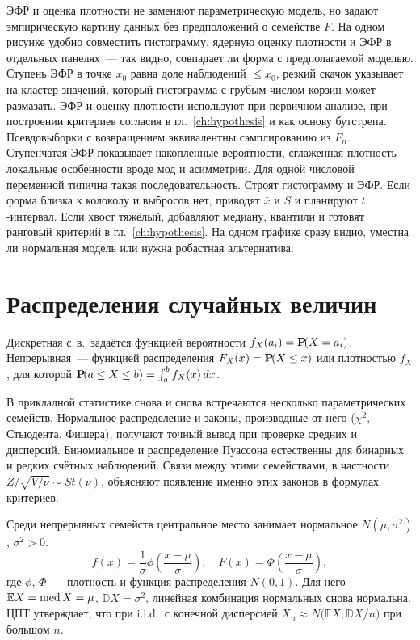 ЭФР и оценка плотности не заменяют параметрическую модель, но задают эмпирическую картину данных без предположений о семействе $F$.
На одном рисунке удобно совместить гистограмму, ядерную оценку плотности и ЭФР в отдельных панелях~--- так видно, совпадает ли форма с предполагаемой моделью. Ступень ЭФР в точке $x_0$ равна доле наблюдений $\le x_0$, резкий скачок указывает на кластер значений, который гистограмма с грубым числом корзин может размазать.
ЭФР и оценку плотности используют при первичном анализе, при построении критериев согласия в гл.~\ref{ch:hypothesis} и как основу бутстрепа. Псевдовыборки с возвращением эквивалентны сэмплированию из $F_n$. Ступенчатая ЭФР показывает накопленные вероятности, сглаженная плотность~--- локальные особенности вроде мод и асимметрии.
Для одной числовой переменной типична такая последовательность. Строят гистограмму и ЭФР. Если форма близка к колоколу и выбросов нет, приводят $\bar x$ и $S$ и планируют $t$-интервал. Если хвост тяжёлый, добавляют медиану, квантили и готовят ранговый критерий в гл.~\ref{ch:hypothesis}. На одном графике сразу видно, уместна ли нормальная модель или нужна робастная альтернатива.

\section{Распределения случайных величин}

\begin{definition}
Дискретная с.\,в.\ задаётся функцией вероятности $f_X(a_i)=\operatorname{\mathbf{P}\!}(X=a_i)$. Непрерывная~--- функцией распределения $F_X(x)=\operatorname{\mathbf{P}\!}(X\le x)$ или плотностью $f_X$, для которой $\operatorname{\mathbf{P}\!}(a\le X\le b)=\int_a^b f_X(x)\,dx$.
\end{definition}

В прикладной статистике снова и снова встречаются несколько параметрических семейств. Нормальное распределение и законы, производные от него ($\chi^2$, Стьюдента, Фишера), получают точный вывод при проверке средних и дисперсий. Биномиальное и распределение Пуассона естественны для бинарных и редких счётных наблюдений. Связи между этими семействами, в частности $Z/\sqrt{V/\nu}\sim St(\nu)$, объясняют появление именно этих законов в формулах критериев.

Среди непрерывных семейств центральное место занимает нормальное $N(\mu,\sigma^2)$, $\sigma^2>0$. \[ f(x)=\frac1\sigma\phi\!\left(\frac{x-\mu}{\sigma}\right),\quad F(x)=\Phi\!\left(\frac{x-\mu}{\sigma}\right), \] где $\phi$, $\Phi$~--- плотность и функция распределения $N(0,1)$.
Для него $\mathbb EX=\operatorname{med} X=\mu$, $\mathbb DX=\sigma^2$, линейная комбинация нормальных снова нормальна. ЦПТ утверждает, что при i.i.d.\ с конечной дисперсией $\bar X_n \approx N\!\bigl(\mathbb EX,\mathbb DX/n\bigr)$ при большом $n$.

